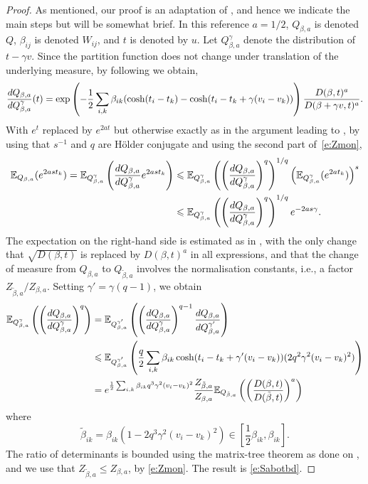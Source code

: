 \documentclass[11pt]{amsart}
\numberwithin{equation}{section}
\numberwithin{theorem}{section}
\begin{document}
\begin{proof}
  As mentioned, our proof is an adaptation of
  \cite[Lemma~1]{1907.07949}, and hence we indicate the main steps
  but will be somewhat brief. In this reference
  $a=1/2$, $Q_{\beta,a}$ is denoted $Q$,
  $\beta_{ij}$ is denoted $W_{ij}$, and $t$ is denoted by $u$.
  Let $Q_{\beta,a}^\gamma$ denote the distribution of $t-\gamma
  v$. Since the partition function does not change under translation
  of the underlying measure, by following %
  \cite[Prop.~1]{1907.07949} we obtain,
  \begin{equation}
    \frac{dQ_{\beta,a}}{dQ^\gamma_{\beta,a}}(t)
    = \exp\left({-\frac12 \sum_{i,k} \beta_{ik} (\cosh(t_i-t_k)-\cosh(t_i-t_k+\gamma(v_i-v_k))}\right) \frac{D(\beta,t)^a}{D(\beta+\gamma v,t)^a}
    .
  \end{equation}
  With $e^t$ replaced by $e^{2at}$ but otherwise exactly as in the
  argument leading to \cite[(2)]{1907.07949}, by using that
    $s^{-1}$ and $q$ are H\"{o}lder conjugate and using the second
    part of~\eqref{e:Zmon},
  \begin{align}
    \mathbb{E}_{Q_{\beta,a}}(e^{2a s t_k})=\mathbb{E}_{Q^\gamma_{\beta,a}}\left({{\frac{dQ_{\beta,a}}{dQ^\gamma_{\beta,a}}}e^{2a s t_k}}\right)
  &  \leqslant \mathbb{E}_{Q^\gamma_{\beta,a}}\left({\left({\frac{dQ_{\beta,a}}{dQ^\gamma_{\beta,a}}}\right)^q}\right)^{1/q} \left({\mathbb{E}_{Q^\gamma_{\beta,a}}({e^{2a t_k}})}\right)^s
   \nonumber\\
    &\leqslant \mathbb{E}_{Q^\gamma_{\beta,a}}\left({\left({\frac{dQ_{\beta,a}}{dQ^\gamma_{\beta,a}}}\right)^q}\right)^{1/q} e^{-2a s\gamma}.
  \end{align}
  The expectation on the right-hand side is estimated as in
  \cite{1907.07949}, with the only change that $\sqrt{D(\beta,t)}$ is
  replaced by $D(\beta,t)^a$ in all expressions, and that the change
  of measure from $Q_{\beta,a}$ to $Q_{\tilde \beta,a}$ involves the
  normalisation constants, i.e., a factor
  $Z_{\tilde \beta,a}/Z_{\beta,a}$. Setting
    $\gamma'= \gamma(q-1)$, we obtain
  \begin{align}
    \mathbb{E}_{Q^\gamma_{\beta,a}}\left({\left({\frac{dQ_{\beta,a}}{dQ^\gamma_{\beta,a}}}\right)^q}\right)
    &=
    \mathbb{E}_{Q^{\gamma'}_{\beta,a}}\left({\left({\frac{dQ_{\beta,a}}{dQ^\gamma_{\beta,a}}}\right)^{q-1}\frac{dQ_{\beta,a}}{dQ^{\gamma'}_{\beta,a}}}\right)
      \nonumber\\
    &\leqslant
    \mathbb{E}_{Q^{\gamma'}_{\beta,a}}\left({\frac{q}{2} \sum_{i,k} \beta_{ik}\cosh(t_i-t_k+\gamma'(v_i-v_k))(2q^2\gamma^2 (v_i-v_k)^2)}\right)
      \nonumber\\
    &=
      e^{\frac12 \sum_{i,k} \beta_{ik} { q^3}\gamma^2 (v_i-v_k)^2}
      \frac{Z_{\tilde \beta,a}}{Z_{\beta,a}}\mathbb{E}_{Q_{\tilde \beta,a}}\left({\left({\frac{D(\beta,t)}{D(\tilde\beta,t)}}\right)^a}\right)
  \end{align}
  where
  \begin{equation}
    \tilde \beta_{ik} = \beta_{ik}(1-2q^3\gamma^2(v_i-v_k)^2) \in
    [\frac12 \beta_{ik}, \beta_{ik}].
  \end{equation}
  The ratio of determinants is bounded using the matrix-tree theorem
  as done on \cite[p.7]{1907.07949},
  and we use that $Z_{\tilde \beta,a} \leq Z_{\beta,a}$, by \eqref{e:Zmon}.
  The result is \eqref{e:Sabotbd}.
\end{proof}
\end{document}
